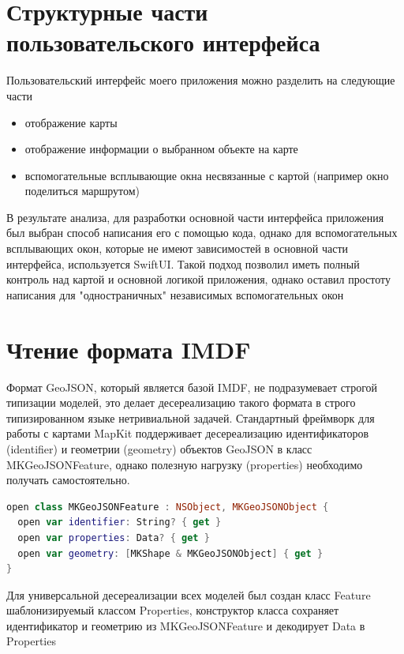   \section{Структурные части пользовательского интерфейса}
    Пользовательский интерфейс моего приложения можно разделить на следующие части
    \begin{itemize}
      \item отображение карты
      \item отображение информации о выбранном объекте на карте
      \item вспомогательные всплывающие окна несвязанные с картой (например окно поделиться маршрутом)
    \end{itemize}

    В результате анализа, для разработки основной части интерфейса приложения был выбран способ написания его с помощью кода, однако для вспомогательных всплывающих окон, которые не имеют зависимостей в основной части интерфейса, используется SwiftUI. Такой подход позволил иметь полный контроль над картой и основной логикой приложения, однако оставил простоту написания для "одностраничных" независимых вспомогательных окон


  \section{Чтение формата IMDF}
    Формат GeoJSON, который является базой IMDF, не подразумевает строгой типизации моделей, это делает десереализацию такого формата в строго типизированном языке нетривиальной задачей. Стандартный фреймворк для работы с картами MapKit поддерживает десереализацию идентификаторов (identifier) и геометрии (geometry) объектов GeoJSON в класс MKGeoJSONFeature, однако полезную нагрузку (properties) необходимо получать самостоятельно.

    \begin{lstlisting}[language=swift,caption={Интерфейс объекта MKGeoJSONFeature}]
open class MKGeoJSONFeature : NSObject, MKGeoJSONObject {
  open var identifier: String? { get }
  open var properties: Data? { get }
  open var geometry: [MKShape & MKGeoJSONObject] { get }
}
  \end{lstlisting}

    Для универсальной десереализации всех моделей был создан класс Feature шаблонизируемый классом Properties, конструктор класса сохраняет идентификатор и геометрию из MKGeoJSONFeature и декодирует Data в Properties

